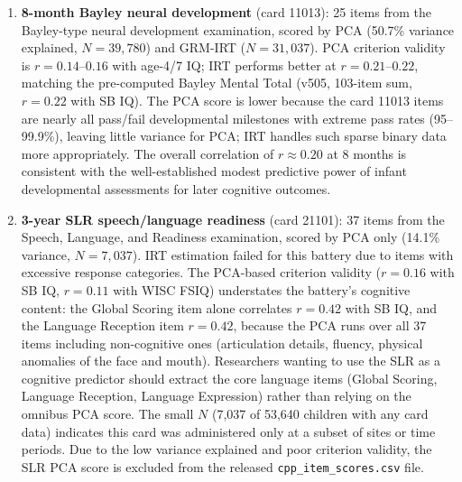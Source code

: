 \documentclass[12pt]{article}
\begin{document}
\begin{enumerate}
\item \textbf{8-month Bayley neural development} (card 11013): 25 items from the Bayley-type neural development examination, scored by PCA (50.7\% variance explained, $N = 39{,}780$) and GRM-IRT ($N = 31{,}037$). PCA criterion validity is $r = 0.14$--$0.16$ with age-4/7 IQ; IRT performs better at $r = 0.21$--$0.22$, matching the pre-computed Bayley Mental Total (v505, 103-item sum, $r = 0.22$ with SB IQ). The PCA score is lower because the card 11013 items are nearly all pass/fail developmental milestones with extreme pass rates (95--99.9\%), leaving little variance for PCA; IRT handles such sparse binary data more appropriately. The overall correlation of $r \approx 0.20$ at 8 months is consistent with the well-established modest predictive power of infant developmental assessments for later cognitive outcomes.

\item \textbf{3-year SLR speech/language readiness} (card 21101): 37 items from the Speech, Language, and Readiness examination, scored by PCA only (14.1\% variance, $N = 7{,}037$). IRT estimation failed for this battery due to items with excessive response categories. The PCA-based criterion validity ($r = 0.16$ with SB IQ, $r = 0.11$ with WISC FSIQ) understates the battery's cognitive content: the Global Scoring item alone correlates $r = 0.42$ with SB IQ, and the Language Reception item $r = 0.42$, because the PCA runs over all 37 items including non-cognitive ones (articulation details, fluency, physical anomalies of the face and mouth). Researchers wanting to use the SLR as a cognitive predictor should extract the core language items (Global Scoring, Language Reception, Language Expression) rather than relying on the omnibus PCA score. The small $N$ (7,037 of 53,640 children with any card data) indicates this card was administered only at a subset of sites or time periods. Due to the low variance explained and poor criterion validity, the SLR PCA score is excluded from the released \texttt{cpp\_item\_scores.csv} file.


\end{enumerate}
\end{document}
